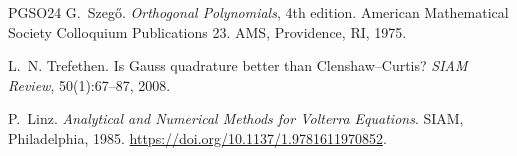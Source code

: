 \begin{thebibliography}{PGSO24}
G.~Szeg\H{o}.
\newblock \emph{Orthogonal Polynomials}, 4th edition.
\newblock American Mathematical Society Colloquium Publications 23. AMS,
  Providence, RI, 1975.

L.~N. Trefethen.
\newblock Is {G}auss quadrature better than {C}lenshaw--{C}urtis?
\newblock \emph{SIAM Review}, 50(1):67--87, 2008.

P.~Linz.
\newblock \emph{Analytical and Numerical Methods for Volterra Equations}.
\newblock SIAM, Philadelphia, 1985.
\newblock \url{https://doi.org/10.1137/1.9781611970852}.

\end{thebibliography}
